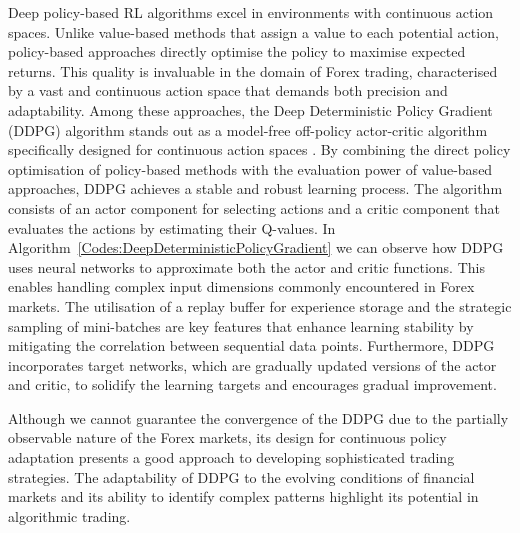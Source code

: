 Deep policy-based RL algorithms excel in environments with continuous action spaces. Unlike value-based methods that assign a value to each potential action, policy-based approaches directly optimise the policy to maximise expected returns. This quality is invaluable in the domain of Forex trading, characterised by a vast and continuous action space that demands both precision and adaptability. Among these approaches, the Deep Deterministic Policy Gradient (DDPG) algorithm stands out as a model-free off-policy actor-critic algorithm specifically designed for continuous action spaces \cite{lillicrap_continuous_2015}. By combining the direct policy optimisation of policy-based methods with the evaluation power of value-based approaches, DDPG achieves a stable and robust learning process. The algorithm consists of an actor component for selecting actions and a critic component that evaluates the actions by estimating their Q-values. In Algorithm~\ref{Codes:DeepDeterministicPolicyGradient} we can observe how DDPG uses neural networks to approximate both the actor and critic functions. This enables handling complex input dimensions commonly encountered in Forex markets. The utilisation of a replay buffer for experience storage and the strategic sampling of mini-batches are key features that enhance learning stability by mitigating the correlation between sequential data points. Furthermore, DDPG incorporates target networks, which are gradually updated versions of the actor and critic, to solidify the learning targets and encourages gradual improvement.



Although we cannot guarantee the convergence of the DDPG due to the partially observable nature of the Forex markets, its design for continuous policy adaptation presents a good approach to developing sophisticated trading strategies. The adaptability of DDPG to the evolving conditions of financial markets and its ability to identify complex patterns highlight its potential in algorithmic trading.
